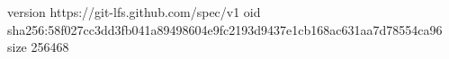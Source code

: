 version https://git-lfs.github.com/spec/v1
oid sha256:58f027cc3dd3fb041a89498604e9fc2193d9437e1cb168ac631aa7d78554ca96
size 256468
